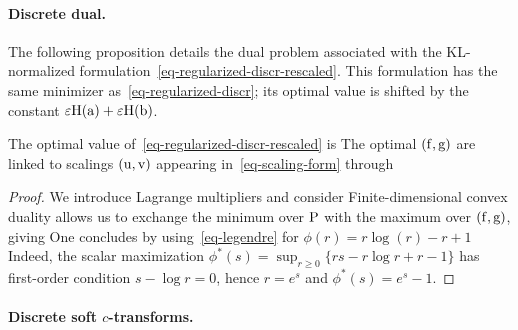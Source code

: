 \paragraph{Discrete dual.}

The following proposition details the dual problem associated with the KL-normalized formulation~\eqref{eq-regularized-discr-rescaled}. This formulation has the same minimizer as~\eqref{eq-regularized-discr}; its optimal value is shifted by the constant $\epsilon\HD(\a)+\epsilon\HD(\b)$.

\begin{prop}
The optimal value of~\eqref{eq-regularized-discr-rescaled} is
%
The optimal $(\fD,\gD)$ are linked to scalings $(\uD,\vD)$ appearing in~\eqref{eq-scaling-form} through
\end{prop}

\begin{proof}
We introduce Lagrange multipliers and consider
	Finite-dimensional convex duality allows us to exchange the minimum over $\P$ with the maximum over $(\fD,\gD)$, giving
	One concludes by using~\eqref{eq-legendre} for $\phi(r)=r \log(r)-r+1$
	Indeed, the scalar maximization
	\(\phi^*(s)=\sup_{r\geq0}\{rs-r\log r+r-1\}\)
	has first-order condition $s-\log r=0$, hence $r=e^s$ and $\phi^*(s)=e^s-1$.
\end{proof}

\paragraph{Discrete soft $c$-transforms.}

